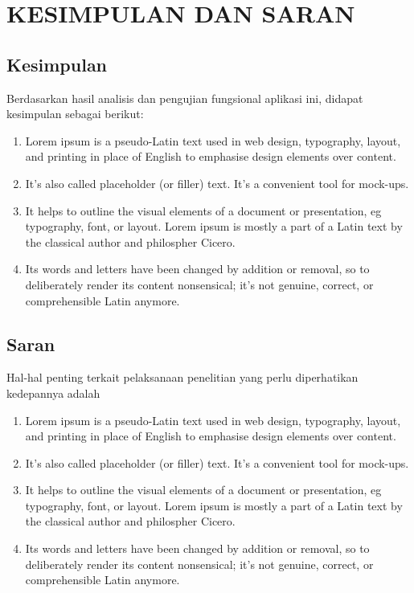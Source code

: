 \chapter{KESIMPULAN DAN SARAN}

\section{Kesimpulan}
Berdasarkan hasil analisis dan pengujian fungsional aplikasi ini, didapat kesimpulan sebagai berikut:

\begin{enumerate}
	\item Lorem ipsum is a pseudo-Latin text used in web design, typography, layout, and printing in place of English to emphasise design elements over content.

	\item It's also called placeholder (or filler) text. It's a convenient tool for mock-ups.

	\item It helps to outline the visual elements of a document or presentation, eg typography, font, or layout. Lorem ipsum is mostly a part of a Latin text by the classical author and philospher Cicero.

	\item Its words and letters have been changed by addition or removal, so to deliberately render its content nonsensical; it's not genuine, correct, or comprehensible Latin anymore.
\end{enumerate}


\section{Saran}
Hal-hal penting terkait pelaksanaan penelitian yang perlu diperhatikan kedepannya adalah
\begin{enumerate}
	\item Lorem ipsum is a pseudo-Latin text used in web design, typography, layout, and printing in place of English to emphasise design elements over content.

	\item It's also called placeholder (or filler) text. It's a convenient tool for mock-ups.

	\item It helps to outline the visual elements of a document or presentation, eg typography, font, or layout. Lorem ipsum is mostly a part of a Latin text by the classical author and philospher Cicero.

	\item Its words and letters have been changed by addition or removal, so to deliberately render its content nonsensical; it's not genuine, correct, or comprehensible Latin anymore.
\end{enumerate}

